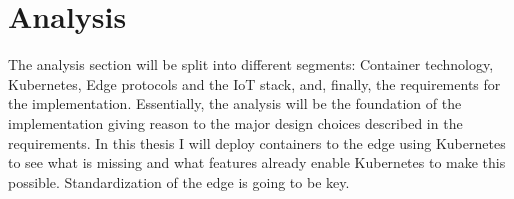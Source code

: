 \section{Analysis} \label{sec:analysis}
The analysis section will be split into different segments: Container technology, Kubernetes, Edge protocols and the IoT stack, and, finally, the requirements for the implementation. Essentially, the analysis will be the foundation of the implementation giving reason to the major design choices described in the requirements.
In this thesis I will deploy containers to the edge using Kubernetes to see what is missing and what features already enable Kubernetes to make this possible.
Standardization of the edge is going to be key.






